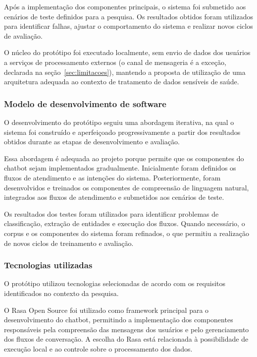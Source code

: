 \documentclass[12pt,a4paper]{extarticle}
\begin{document}
Após a implementação dos componentes principais, o sistema foi submetido aos cenários de teste definidos para a pesquisa. Os resultados obtidos foram utilizados para identificar falhas, ajustar o comportamento do sistema e realizar novos ciclos de avaliação.

O núcleo do protótipo foi executado localmente, sem envio de dados dos usuários a serviços de processamento externos (o canal de mensageria é a exceção, declarada na seção~\ref{sec:limitacoes}), mantendo a proposta de utilização de uma arquitetura adequada ao contexto de tratamento de dados sensíveis de saúde.

\subsubsection{Modelo de desenvolvimento de software}

O desenvolvimento do protótipo seguiu uma abordagem iterativa, na qual o sistema foi construído e aperfeiçoado progressivamente a partir dos resultados obtidos durante as etapas de desenvolvimento e avaliação.

Essa abordagem é adequada ao projeto porque permite que os componentes do chatbot sejam implementados gradualmente. Inicialmente foram definidos os fluxos de atendimento e as intenções do sistema. Posteriormente, foram desenvolvidos e treinados os componentes de compreensão de linguagem natural, integrados aos fluxos de atendimento e submetidos aos cenários de teste.

Os resultados dos testes foram utilizados para identificar problemas de classificação, extração de entidades e execução dos fluxos. Quando necessário, o corpus e os componentes do sistema foram refinados, o que permitiu a realização de novos ciclos de treinamento e avaliação.

\subsubsection{Tecnologias utilizadas}

O protótipo utilizou tecnologias selecionadas de acordo com os requisitos identificados no contexto da pesquisa.

O Rasa Open Source foi utilizado como framework principal para o desenvolvimento do chatbot, permitindo a implementação dos componentes responsáveis pela compreensão das mensagens dos usuários e pelo gerenciamento dos fluxos de conversação. A escolha do Rasa está relacionada à possibilidade de execução local e ao controle sobre o processamento dos dados.
\end{document}
